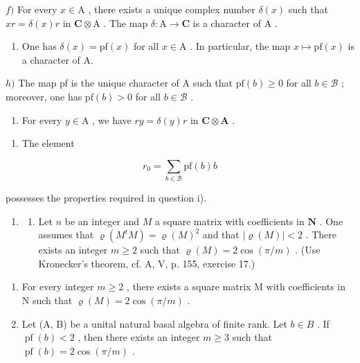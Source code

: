 \(f)\) For every \(x \in \mathrm{A}\) , there exists a unique complex number \(\delta(x)\) such that \(xr = \delta(x)r\) in \(\mathbf{C} \otimes \mathrm{A}\) . The map \(\delta: \mathrm{A} \to \mathbf{C}\) is a character of \(\mathrm{A}\) .

\begin{enumerate}
\def\labelenumi{\alph{enumi})}
\setcounter{enumi}{6}
\tightlist
\item
  One has \(\delta(x) = \mathrm{pf}(x)\) for all \(x \in \mathrm{A}\) . In particular, the map \(x \mapsto \mathrm{pf}(x)\) is a character of A.
\end{enumerate}

\(h)\) The map pf is the unique character of A such that \(\mathrm{pf}(b) \geqslant 0\) for all \(b \in \mathcal{B}\) ; moreover, one has \(\mathrm{pf}(b) > 0\) for all \(b \in \mathcal{B}\) .

\begin{enumerate}
\def\labelenumi{\roman{enumi})}
\tightlist
\item
  For every \(y \in \mathrm{A}\) , we have \(ry = \delta(y)r\) in \(\mathbf{C} \otimes \mathbf{A}\) .
\end{enumerate}

\begin{enumerate}
\def\labelenumi{\alph{enumi})}
\setcounter{enumi}{9}
\tightlist
\item
  The element
\end{enumerate}

\[
r _ {0} = \sum_ {b \in \mathcal {B}} \mathrm{pf} (b) b
\]

possesses the properties required in question i).

\begin{enumerate}
\def\labelenumi{\arabic{enumi})}
\setcounter{enumi}{8}
\tightlist
\item
  \begin{enumerate}
  \def\labelenumii{\alph{enumii})}
  \tightlist
  \item
    Let \(n\) be an integer and \(M\) a square matrix with coefficients in \(\mathbf{N}\) . One assumes that \(\varrho(M^t M) = \varrho(M)^2\) and that \(|\varrho(M)| < 2\) . There exists an integer \(m \geqslant 2\) such that \(\varrho(M) = 2\cos(\pi/m)\) . (Use Kronecker's theorem, cf. A, V, p. 155, exercise 17.)
  \end{enumerate}
\end{enumerate}

\begin{enumerate}
\def\labelenumi{\alph{enumi})}
\setcounter{enumi}{1}
\item
  For every integer \(m \geqslant 2\) , there exists a square matrix M with coefficients in N such that \(\varrho(M) = 2 \cos(\pi/m)\) .
\item
  Let (A, B) be a unital natural basal algebra of finite rank. Let \(b \in B\) . If \(\operatorname{pf}(b) < 2\) , then there exists an integer \(m \geqslant 3\) such that \(\operatorname{pf}(b) = 2 \cos(\pi/m)\) .
\end{enumerate}

